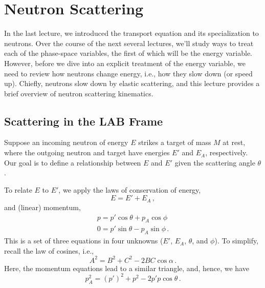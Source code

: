 \chapter{Neutron Scattering}

In the last lecture, we introduced the transport equation and 
its specialization to neutrons.  Over the course of the next several
lectures, we'll study ways to treat each of the phase-space 
variables, the first of which will be the energy variable.  However,
before we dive into an explicit treatment 
of the energy variable, we need to review how neutrons
change energy, i.e., how they slow down (or speed up).  Chiefly, neutrons 
slow down by elastic scattering, and this 
lecture provides a brief overview
of neutron scattering kinematics.

\section*{Scattering in the LAB Frame}

Suppose an incoming neutron of energy $E$ strikes a target of mass
$M$ at rest, where
the outgoing neutron and target have energies $E'$ and $E_A$, 
respectively.  Our goal is to define a relationship between 
$E$ and $E'$ given the scattering angle $\theta$.

To relate $E$ to $E'$, we apply the laws of conservation of energy,
\begin{equation}
  E = E' + E_A \, ,
\label{eq:conservation_energy}
\end{equation}
and (linear) momentum,
\begin{equation}
\begin{split}
 p = p' \cos \theta  + p_A \cos \phi \\
 0 = p' \sin \theta  - p_A \sin \phi \, .
\end{split}
\end{equation}
This is a set of three equations in four unknowns ($E'$, $E_A$, 
$\theta$, and $\phi$).  To simplify, recall the law of 
cosines, i.e.,
\begin{equation}
  A^2 = B^2 + C^2 - 2BC\cos \alpha \, .
\end{equation}
Here, the momentum equations lead to a similar triangle, and, hence,
we have
\begin{equation}
  p_A^2 = (p')^2 + p^2 - 2p'p \cos \theta \, .
\end{equation}

